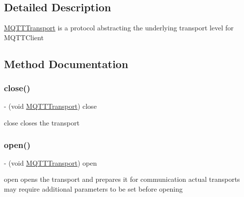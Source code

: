 \subsection{Detailed Description}
\hyperlink{interface_m_q_t_t_transport}{M\+Q\+T\+T\+Transport} is a protocol abstracting the underlying transport level for M\+Q\+T\+T\+Client 

\subsection{Method Documentation}
\mbox{\label{protocol_m_q_t_t_transport_01-p_a7a0c40f02204b591d3e47ee02d83c5e6}} 
\subsubsection{\texorpdfstring{close()}{close()}}
{\footnotesize\ttfamily -\/ (void \hyperlink{interface_m_q_t_t_transport}{M\+Q\+T\+T\+Transport}) close \begin{DoxyParamCaption}{ }\end{DoxyParamCaption}}

close closes the transport \mbox{\label{protocol_m_q_t_t_transport_01-p_a429a7bae51d2c25dcface523c2a75dae}} 
\subsubsection{\texorpdfstring{open()}{open()}}
{\footnotesize\ttfamily -\/ (void \hyperlink{interface_m_q_t_t_transport}{M\+Q\+T\+T\+Transport}) open \begin{DoxyParamCaption}{ }\end{DoxyParamCaption}}

open opens the transport and prepares it for communication actual transports may require additional parameters to be set before opening \mbox{\label{protocol_m_q_t_t_transport_01-p_adfba8a25ec9ae9cbc65d908018118555}} 
